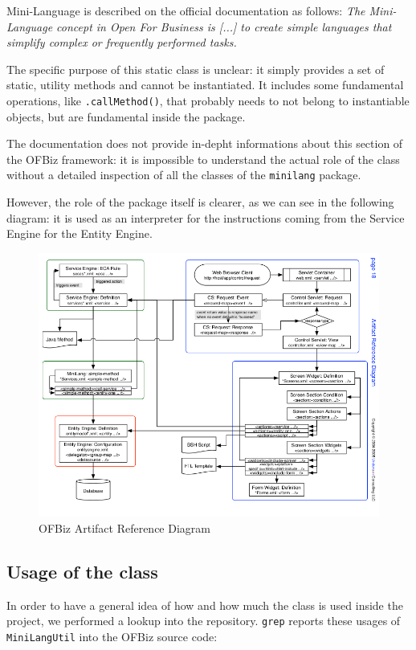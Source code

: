 \documentclass[11pt]{article} %
\begin{document}
Mini-Language is described on the official documentation as follows: \textit{The Mini-Language concept in Open For Business is [...] to create simple languages that simplify complex or frequently performed tasks.}

The specific purpose of this static class is unclear: it simply provides a set of static, utility methods and cannot be instantiated. It includes some fundamental operations, like \texttt{.callMethod()}, that probably needs to not belong to instantiable objects, but are fundamental inside the package.

The documentation does not provide in-depht informations about this section of the OFBiz framework: it is impossible to understand the actual role of the class without a detailed inspection of all the classes of the \texttt{minilang} package.

However, the role of the package itself is clearer, as we can see in the following diagram: it is used as an interpreter for the instructions coming from the Service Engine for the Entity Engine.

\begin{figure}[H]
	\centering
	\includegraphics[width=1
\textwidth]{Diagram1.png}
	\caption{OFBiz Artifact Reference Diagram}
\end{figure}


\subsection{Usage of the class}

In order to have a general idea of how and how much the class is used inside the project, we performed a lookup into the repository. \texttt{grep} reports these usages of \texttt{MiniLangUtil} into the OFBiz source code:
\end{document}
